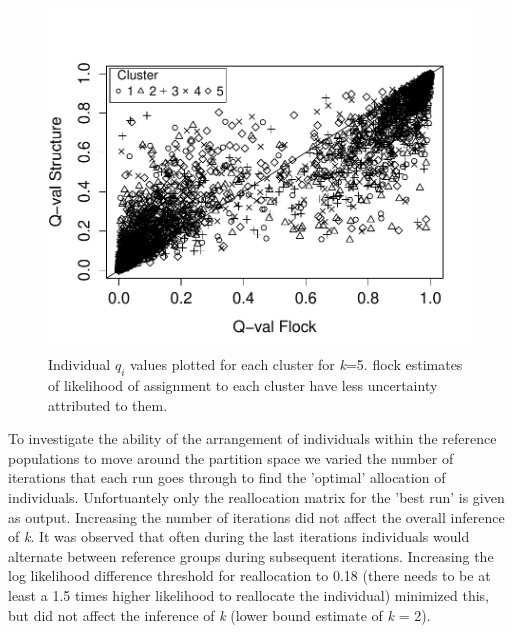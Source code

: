 \begin{figure}
\begin{center}
 \includegraphics[width=\textwidth]{images/Figures-Pat/Qval-1plotGreyScale.pdf}
    \caption{Individual \textit{$q_i$} values plotted for each cluster for \textit{k}=5. 
{\sc flock} estimates of likelihood of assignment to each cluster have less uncertainty
 attributed to them.}
    \label{Fig.2}
\end{center}
\end{figure}


To investigate the ability of the arrangement of individuals within the reference 
populations to move around the partition space we varied the number of iterations that 
each run goes through to find the 'optimal' allocation of individuals. Unfortuantely 
only the reallocation matrix for the 'best run' is given as output. Increasing the 
number of iterations did not affect the overall inference of \textit{k}. It was 
observed that often during the last iterations individuals would alternate between 
reference groups during subsequent iterations. Increasing the log likelihood 
difference threshold for reallocation to 0.18 (there needs to be at least a 1.5 times 
higher likelihood to reallocate the individual) minimized this, but did not affect the 
inference of \textit{k} (lower bound estimate of \textit{k} = 2). 


